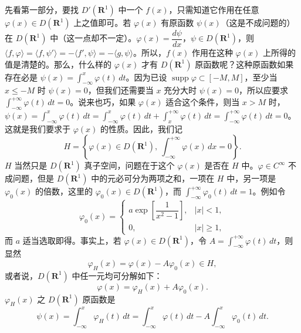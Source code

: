 先看第一部分，要找 $D'(\mathbf R^1)$ 中一个 $f(x)$，只需知道它作用在任意 $\varphi(x)\in D(\mathbf R^1)$ 上之值即可。若 $\varphi(x)$ 有原函数 $\psi(x)$（这是不成问题的）在 $D(\mathbf R^1)$ 中（这一点却不一定）。$\varphi(x)=\dfrac{d\psi}{dx}$，$\psi\in D(\mathbf R^1)$，则 $\langle f,\varphi\rangle=\langle f,\psi'\rangle=-\langle f',\psi\rangle=-\langle g,\psi\rangle$。所以，$f(x)$ 作用在这种 $\varphi(x)$ 上所得的值是清楚的。那么，什么样的 $\varphi(x)$ 才有 $D(\mathbf R^1)$ 原函数呢？这种原函数如果存在必是 $\psi(x)=\int_{-\infty}^{x}\varphi(t)\,dt$。因为已设 $\operatorname{supp}\varphi\subset[-M,M]$，至少当 $x\le-M$ 时 $\psi(x)=0$，但我们还需要当 $x$ 充分大时 $\psi(x)=0$，所以应要求 $\int_{-\infty}^{+\infty}\varphi(t)\,dt=0$。说来也巧，如果 $\varphi(x)$ 适合这个条件，则当 $x>M$ 时，$\psi(x)=\int_{-\infty}^{x}\varphi(t)\,dt=\int_{-\infty}^{x}\varphi(t)\,dt+\int_x^{+\infty}\varphi(t)\,dt=\int_{-\infty}^{+\infty}\varphi(t)\,dt=0$。这就是我们要求于 $\varphi(x)$ 的性质。因此，我们记
\begin{equation}
 H=\left\{\varphi(x)\in D(\mathbf R^1),\ \int_{-\infty}^{+\infty}\varphi(x)\,dx=0\right\}.
 \tag{24}
\end{equation}
$H$ 当然只是 $D(\mathbf R^1)$ 真子空间，问题在于这个 $\varphi(x)$ 是否在 $H$ 中。$\varphi\in C^\infty$ 不成问题，但是 $D(\mathbf R^1)$ 中的元必可分为两项之和，一项在 $H$ 中，另一项是 $\varphi_0(x)$ 的倍数，这里的 $\varphi_0(x)\in D(\mathbf R^1)$，而 $\int_{-\infty}^{+\infty}\varphi_0(t)\,dt=1$。例如令
\[
 \varphi_0(x)=
 \begin{cases}
 a\exp\!\left[\dfrac1{x^2-1}\right],&|x|<1,\\[6pt]
 0,&|x|\ge1,
 \end{cases}
\]
而 $a$ 适当选取即得。事实上，若 $\varphi(x)\in D(\mathbf R^1)$，令 $A=\int_{-\infty}^{+\infty}\varphi(t)\,dt$，则显然
\[
 \varphi_H(x)=\varphi(x)-A\varphi_0(x)\in H,
\]
或者说，$D(\mathbf R^1)$ 中任一元均可分解如下：
\begin{equation}
 \varphi(x)=\varphi_H(x)+A\varphi_0(x).
 \tag{25}
\end{equation}
$\varphi_H(x)$ 之 $D(\mathbf R^1)$ 原函数是
\begin{equation}
 \psi(x)=\int_{-\infty}^{x}\varphi_H(t)\,dt
 =\int_{-\infty}^{x}\varphi(t)\,dt-A\int_{-\infty}^{x}\varphi_0(t)\,dt.
 \tag{26}
\end{equation}
